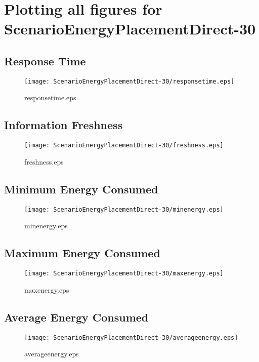 \documentclass{elsart}
\begin{document}
\section{Plotting all figures for ScenarioEnergyPlacementDirect-30}
\subsection{Response Time}

\begin{figure}[ht]
\centering
\texttt{[image: ScenarioEnergyPlacementDirect-30/responsetime.eps]}
\caption{responsetime.eps}\label{fig:responsetime}
\end{figure}

\clearpage
\subsection{Information Freshness}

\begin{figure}[ht]
\centering
\texttt{[image: ScenarioEnergyPlacementDirect-30/freshness.eps]}
\caption{freshness.eps}\label{fig:freshness}
\end{figure}

\clearpage
\subsection{Minimum Energy Consumed}

\begin{figure}[ht]
\centering
\texttt{[image: ScenarioEnergyPlacementDirect-30/minenergy.eps]}
\caption{minenergy.eps}\label{fig:minenergy}
\end{figure}

\clearpage
\subsection{Maximum Energy Consumed}

\begin{figure}[ht]
\centering
\texttt{[image: ScenarioEnergyPlacementDirect-30/maxenergy.eps]}
\caption{maxenergy.eps}\label{fig:maxenergy}
\end{figure}

\clearpage
\subsection{Average Energy Consumed}

\begin{figure}[ht]
\centering
\texttt{[image: ScenarioEnergyPlacementDirect-30/averageenergy.eps]}
\caption{averageenergy.eps}\label{fig:averageenergy}
\end{figure}
\end{document}
